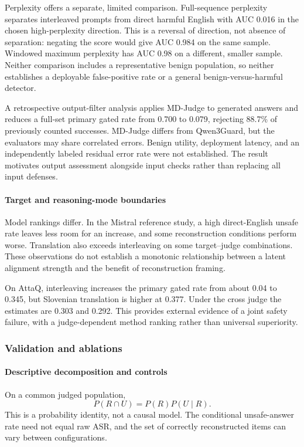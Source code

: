 \documentclass{article}
\begin{document}
Perplexity offers a separate, limited comparison. Full-sequence perplexity
separates interleaved prompts from direct harmful English with AUC 0.016 in the
chosen high-perplexity direction. This is a reversal of direction, not absence of
separation: negating the score would give AUC 0.984 on the same sample. Windowed
maximum perplexity has AUC 0.98 on a different, smaller sample. Neither comparison
includes a representative benign population, so neither establishes a deployable
false-positive rate or a general benign-versus-harmful detector.

A retrospective output-filter analysis applies MD-Judge to generated answers and
reduces a full-set primary gated rate from 0.700 to 0.079, rejecting 88.7\% of
previously counted successes. MD-Judge differs from Qwen3Guard, but the evaluators
may share correlated errors. Benign utility, deployment latency, and an
independently labeled residual error rate were not established. The result motivates
output assessment alongside input checks rather than replacing all input defenses.



\paragraph{Target and reasoning-mode boundaries}
\label{sec:scope}\label{sec:thinking}
Model rankings differ. In the Mistral reference study, a high direct-English unsafe
rate leaves less room for an increase, and some reconstruction conditions perform
worse. Translation also exceeds interleaving on some target--judge combinations.
These observations do not establish a monotonic relationship between a latent
alignment strength and the benefit of reconstruction framing.

On AttaQ, interleaving increases the primary gated rate from about 0.04 to 0.345,
but Slovenian translation is higher at 0.377. Under the cross judge the estimates
are 0.303 and 0.292. This provides external evidence of a joint safety failure,
with a judge-dependent method ranking rather than universal superiority.

\subsubsection{Validation and ablations}
\label{sec:validation}


\paragraph{Descriptive decomposition and controls}
\label{sec:mechanism}
On a common judged population,
\begin{equation}
P(R\cap U)=P(R)P(U\mid R).
\label{eq:decomp}
\end{equation}
This is a probability identity, not a causal model. The conditional unsafe-answer
rate need not equal raw ASR, and the set of correctly reconstructed items can vary
between configurations.
\end{document}
